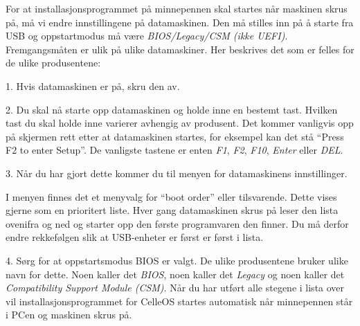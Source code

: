 For at installasjonsprogrammet p\aa{} minnepennen skal startes n\aa r maskinen skrus p\aa , m\aa{} vi endre innstillingene p\aa{} datamaskinen. Den m\aa{} stilles inn p\aa{} \aa{} starte fra USB og oppstartmodus m\aa{} v\ae re {\it BIOS/Legacy/CSM (ikke UEFI)}. Fremgangsm\aa ten er ulik p\aa{} ulike datamaskiner. Her beskrives det som er felles for de ulike produsentene: 
\item{1.} Hvis datamaskinen er p\aa, skru den av.
\item{2.} Du skal n\aa{} starte opp datamaskinen og holde inne en bestemt tast. Hvilken tast du skal holde inne varierer avhengig av produsent. Det kommer vanligvis opp p\aa{} skjermen rett etter at datamaskinen startes, for eksempel kan det st\aa{} ``Press F2 to enter Setup''. De vanligste tastene er enten {\it F1}, {\it F2}, {\it F10}, {\it Enter} eller {\it DEL}.
\item{3.} N\aa r du har gjort dette kommer du til menyen for datamaskinens innstillinger. 
\medskip
{}
\item{} I menyen finnes det et menyvalg for ``boot order'' eller tilsvarende. Dette vises gjerne som en prioritert liste. Hver gang datamaskinen skrus p\aa{} leser den lista ovenifra og ned og starter opp den f\o rste programvaren den finner. Du m\aa{} derfor endre rekkef\o lgen slik at USB-enheter er f\o rst er f\o rst i lista.
\item{4.} S\o rg for at oppstartsmodus BIOS er valgt. De ulike produsentene bruker ulike navn for dette. Noen kaller det {\it BIOS}, noen kaller det {\it Legacy} og noen kaller det {\it Compatibility Support Module (CSM)}.
\smallskip
\noindent N\aa r du har utf\o rt alle stegene i lista over vil installasjonsprogrammet for CelleOS startes automatisk n\aa r minnepennen st\aa r i PCen og maskinen skrus p\aa.




